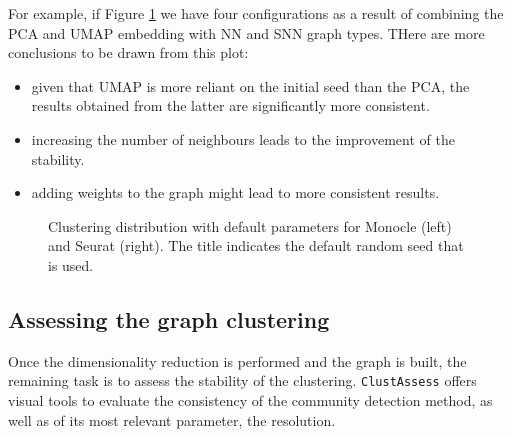 For example, if Figure \ref{fig:ca-nn-ecc} we have four configurations as a result of combining the PCA and UMAP embedding with NN and SNN graph types. THere are more conclusions to be drawn from this plot:
\begin{itemize}
    \item given that UMAP is more reliant on the initial seed than the PCA, the results obtained from the latter are significantly more consistent.
    \item increasing the number of neighbours leads to the improvement of the stability.
    \item adding weights to the graph might lead to more consistent results.
\end{itemize}
\begin{figure}[H]
    \centering
    \caption{\label{fig:ca-nn-ecc}Clustering distribution with default parameters for Monocle (left) and Seurat (right). The title indicates the default random seed that is used.}
\end{figure}

\subsection{Assessing the graph clustering}
Once the dimensionality reduction is performed and the graph is built, the remaining task is to assess the stability of the clustering. \verb|ClustAssess| offers visual tools to evaluate the consistency of the community detection method, as well as of its most relevant parameter, the resolution.

